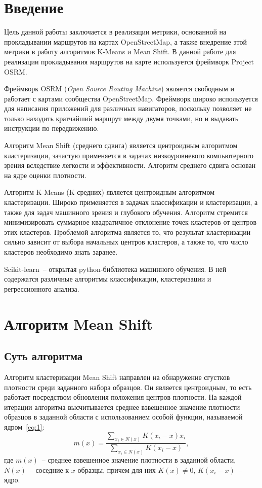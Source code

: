 \chapter{Введение}
Цель данной работы заключается в реализации метрики, основанной на прокладывании маршрутов на
картах OpenStreetMap, а также внедрение этой метрики в работу алгоритмов K-Means и Mean Shift.
В данной работе для реализации прокладывания маршрутов на карте используется фреймворк
Project OSRM.

Фреймворк OSRM (\emph{Open Source Routing Machine}) является свободным и работает с картами
сообщества OpenStreetMap. Фреймворк широко используется для написания приложений для различных
навигаторов, поскольку позволяет не только находить кратчайший маршрут между двумя точками, но и
выдавать инструкции по передвижению.

Алгоритм Mean Shift (среднего сдвига) является центроидным алгоритмом кластеризации, зачастую
применяется в задачах низкоуровневого компьютерного зрения вследствие легкости и эффективности.
Алгоритм среднего сдвига основан на ядре оценки плотности.

Алгоритм K-Means (K-средних) является центроидным алгоритмом кластеризации. Широко применяется в
задачах классификации и кластеризации, а также для задач машинного зрения и глубокого обучения.
Алгоритм стремится минимизировать суммарное квадратичное отклонение точек кластеров от центров этих
кластеров. Проблемой алгоритма является то, что результат кластеризации сильно зависит от выбора
начальных центров кластеров, а также то, что число кластеров необходимо знать заранее.

Scikit-learn~-- открытая python-библиотека машинного обучения. В ней содержатся различные алгоритмы
классификации, кластеризации и регрессионного анализа.

\newpage

\chapter{Алгоритм Mean Shift}
\section{Суть алгоритма}
Алгоритм кластеризации Mean Shift направлен на обнаружение сгустков плотности среди заданного
набора образцов. Он является центроидным, то есть работает посредством обновления положения центров
плотности. На каждой итерации алгоритма высчитывается среднее взвешенное значение плотности
образцов в заданной области с использованием особой функции, называемой ядром~\eqref{eq:1}:
\begin{equation}
    m(x) = \frac{\sum_{x_i \in N(x)} K(x_i - x)x_i}{\sum_{x_i \in N(x)} K(x_i - x)},
    \label{eq:1}
\end{equation}
где \( m(x) \)~-- среднее взвешенное значение плотности в заданной области, \( N(x) \)~--
соседние к \( x \) образцы, причем для них \( K(x) \ne 0 \), \( K(x_i - x) \)~-- ядро.

